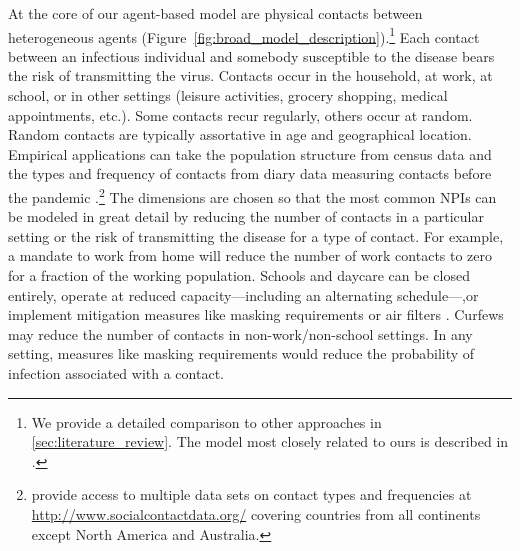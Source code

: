 At the core of our agent-based model are physical contacts between heterogeneous agents
(Figure~\ref{fig:broad_model_description}).\footnote{We provide a detailed comparison to
    other approaches in \ref{sec:literature_review}. The model most closely related to ours
    is described in \citet{Hinch2020}.} Each contact between an infectious individual and
somebody susceptible to the disease bears the risk of transmitting the virus. Contacts
occur in the household, at work, at school, or in other settings (leisure activities,
grocery shopping, medical appointments, etc.). Some contacts recur regularly, others
occur at random. Random contacts are typically assortative in age and geographical
location. Empirical applications can take the population structure from census data and
the types and frequency of contacts from diary data measuring contacts before the
pandemic \citep[e.g.][]{Mossong2008}.\footnote{\citet{Hoang2019} provide access to
    multiple data sets on contact types and frequencies at
    \url{http://www.socialcontactdata.org/} covering countries from all continents except
    North America and Australia.} The dimensions are chosen so that the most common NPIs can
be modeled in great detail by reducing the number of contacts in a particular setting or
the risk of transmitting the disease for a type of contact. For example, a mandate to
work from home will reduce the number of work contacts to zero for a fraction of the
working population. Schools and daycare can be closed entirely, operate at reduced
capacity---including an alternating schedule---,or implement mitigation measures like
masking requirements or air filters \citep{Lessler2021}. Curfews may reduce the number
of contacts in non-work/non-school settings. In any setting, measures like masking
requirements would reduce the probability of infection associated with a contact.

